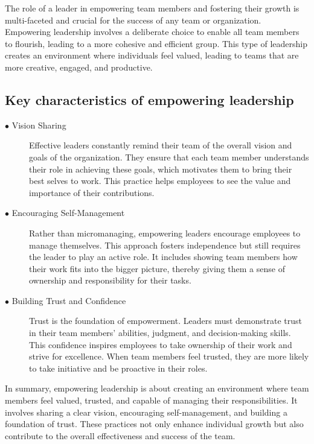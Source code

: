 \documentclass[runningheads]{llncs}
\begin{document}
The role of a leader in empowering team members and fostering their growth is multi-faceted and crucial for the success of any team or organization. Empowering leadership involves a deliberate choice to enable all team members to flourish, leading to a more cohesive and efficient group. This type of leadership creates an environment where individuals feel valued, leading to teams that are more creative, engaged, and productive.

\subsection{Key characteristics of empowering leadership}

\begin{description}
 \item [$\bullet$ Vision Sharing] Effective leaders constantly remind their team of the overall vision and goals of the organization. They ensure that each team member understands their role in achieving these goals, which motivates them to bring their best selves to work. This practice helps employees to see the value and importance of their contributions. \cite{ref_5}\\

 \item [$\bullet$ Encouraging Self-Management] Rather than micromanaging, empowering leaders encourage employees to manage themselves. This approach fosters independence but still requires the leader to play an active role. It includes showing team members how their work fits into the bigger picture, thereby giving them a sense of ownership and responsibility for their tasks. \cite{ref_3}\\

 \item [$\bullet$ Building Trust and Confidence] Trust is the foundation of empowerment. Leaders must demonstrate trust in their team members' abilities, judgment, and decision-making skills. This confidence inspires employees to take ownership of their work and strive for excellence. When team members feel trusted, they are more likely to take initiative and be proactive in their roles. \cite{ref_8}\\
\end{description}

In summary, empowering leadership is about creating an environment where team members feel valued, trusted, and capable of managing their responsibilities. It involves sharing a clear vision, encouraging self-management, and building a foundation of trust. These practices not only enhance individual growth but also contribute to the overall effectiveness and success of the team.
\end{document}
